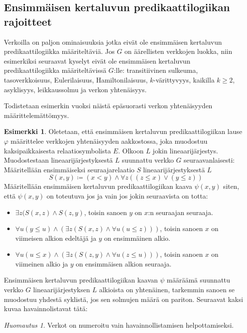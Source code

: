 \documentclass[finnish]{tktltiki2}
\theoremstyle{definition}
\newtheorem{esim}[lau]{Esimerkki}
\theoremstyle{remark}
\newtheorem*{huom}{Huomautus}
\begin{document}
\subsection{Ensimmäisen kertaluvun predikaattilogiikan rajoitteet}
Verkoilla on paljon ominaisuuksia jotka eivät ole ensimmäisen kertaluvun predikaattilogiikka määriteltäviä. Jos $G$ on äärellisten verkkojen luokka, niin esimerkiksi seuraavat kyselyt eivät ole ensimmäisen kertaluvun predikaattilogiikka määriteltävissä $G$:lle: transitiivinen sulkeuma, tasoverkkoisuus, Eulerilaisuus, Hamiltonilaisuus, $k$-värittyvyys, kaikilla $ k \geq 2$, asyklisyys, leikkaussolmu ja verkon yhtenäisyys.

Todistetaan esimerkin vuoksi näistä epäsuorasti verkon yhtenäisyyden määrittelemättömyys.
\begin{esim}
Oletetaan, että ensimmäisen kertaluvun predikaattilogiikan lause $\varphi$ määrittelee verkkojen yhtenäisyyden aakkostossa, joka muodostuu kaksipaikkaisesta relaatiosymbolista $E$. Olkoon $L$ jokin lineaarijärjestys. Muodostestaan lineaarijärjestyksestä $L$ suunnattu verkko $G$ seuraavanlaisesti: Määritellään ensimmäiseksi seuraajarelaatio $S$ lineaarijärjestyksestä $L$ \[S(x, y) \coloneqq (x < y) \land \forall z ((z \leq x) \lor (y \leq z))\]
Määritellään ensimmäisen kertaluvun predikaattilogiikan kaava $\psi(x, y)$ siten, että $\psi(x, y)$ on toteutuva jos ja vain jos jokin seuraavista on totta:
\begin{itemize}
\item $\exists z (S(x, z) \land S(z, y)$, toisin sanoen $y$ on $x$:n seuraajan seuraaja.
\item $\forall u (y \leq u) \land (\exists z(S(x, z) \land \forall u(u \leq z)))$, toisin sanoen $x$ on viimeisen alkion edeltäjä ja $y$ on ensimmäinen alkio.
\item $\forall u (u \leq x) \land (\exists z(S(z, y) \land \forall u(z \leq u)))$, toisin sanoen $x$ on viimeinen alkio ja $y$ on ensimmäisen alkion seuraaja.
\end{itemize}
Ensimmäisen kertaluvun predikaattilogiikan kaavan $\psi$ määräämä suunnattu verkko $G$ lineaarijärjestyksen $L$ alkioista on yhtenäinen, tarkemmin sanoen se muodostuu yhdestä syklistä, jos sen solmujen määrä on pariton. Seuraavat kaksi kuvaa havainnolistavat tätä:

\begin{huom}
Verkot on numeroitu vain havainnollistamisen helpottamiseksi.
\end{huom}


\end{esim}
\end{document}
